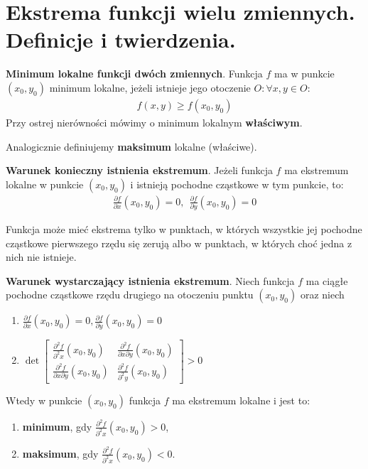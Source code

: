 \documentclass[main.tex]{subfiles}
\begin{document}
    \newpage


    \section{Ekstrema funkcji wielu zmiennych. Definicje i twierdzenia.}

    \begin{definition}
        \textbf{Minimum lokalne funkcji dwóch zmiennych}.
        Funkcja $f$ ma w punkcie $(x_0, y_0)$ minimum lokalne, jeżeli istnieje jego otoczenie
        $O: \forall x, y \in O$:
        \begin{align*}
            f(x,y) \geq f(x_0, y_0)
        \end{align*}
        Przy ostrej nierówności mówimy o minimum lokalnym \textbf{właściwym}.

        Analogicznie definiujemy \textbf{maksimum} lokalne (właściwe).
    \end{definition}

    \begin{theorem}
        \textbf{Warunek konieczny istnienia ekstremum}. Jeżeli funkcja $f$ ma ekstremum lokalne w punkcie $(x_0, y_0)$
        i istnieją pochodne cząstkowe w tym punkcie, to:
        \begin{align*}
            \frac{\partial f}{\partial x}(x_0, y_0) = 0, ~~ \frac{\partial f}{\partial y}(x_0, y_0) = 0
        \end{align*}

        Funkcja może mieć ekstrema tylko w punktach, w których wszystkie jej pochodne cząstkowe pierwszego rzędu się
        zerują albo w punktach, w których choć jedna z nich nie istnieje.
    \end{theorem}

    \begin{theorem}
        \textbf{Warunek wystarczający istnienia ekstremum}. Niech funkcja $f$ ma ciągłe pochodne cząstkowe rzędu drugiego
        na otoczeniu punktu $(x_0, y_0)$ oraz niech
        \begin{enumerate}
            \item $\frac{\partial f}{\partial x}(x_0, y_0) = 0, \frac{\partial f}{\partial y}(x_0, y_0) = 0$
            \item $\det \begin{bmatrix}
                            \frac{\partial^2 f}{\partial^2 x}(x_0, y_0) & \frac{\partial^2 f}{\partial x \partial y}(x_0, y_0) \\
                            \frac{\partial^2 f}{\partial x \partial y}(x_0, y_0) & \frac{\partial^2 f}{\partial^2 y}(x_0, y_0)
            \end{bmatrix} > 0$
        \end{enumerate}
        Wtedy w punkcie $(x_0, y_0)$ funkcja $f$ ma ekstremum lokalne i jest to:
        \begin{enumerate}
            \item \textbf{minimum}, gdy $\frac{\partial^2 f}{\partial^2 x}(x_0, y_0) > 0$,
            \item \textbf{maksimum}, gdy $\frac{\partial^2 f}{\partial^2 x}(x_0, y_0) < 0$.
        \end{enumerate}
    \end{theorem}
\end{document}
